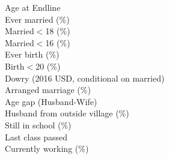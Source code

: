 Age at Endline \\
Ever married (\%) \\
Married$<$18 (\%) \\
Married$<$16 (\%) \\
Ever birth (\%) \\
Birth$<$20 (\%) \\
Dowry (2016 USD, conditional on married) \\
Arranged marriage (\%) \\
Age gap (Husband-Wife) \\
Husband from outside village (\%) \\
Still in school (\%) \\
Last class passed \\
Currently working (\%) \\